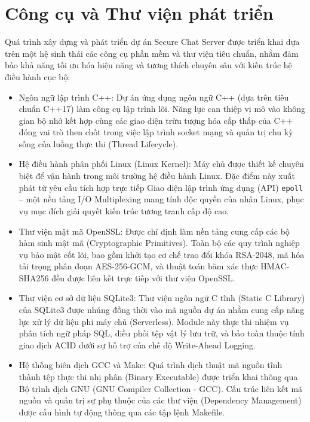 \section{Công cụ và Thư viện phát triển}

Quá trình xây dựng và phát triển dự án Secure Chat Server được triển khai dựa trên một hệ sinh thái các công cụ phần mềm và thư viện tiêu chuẩn, nhằm đảm bảo khả năng tối ưu hóa hiệu năng và tương thích chuyên sâu với kiến trúc hệ điều hành cục bộ:
\begin{itemize}[label={-}]
    \item Ngôn ngữ lập trình C++: Dự án ứng dụng ngôn ngữ C++ (dựa trên tiêu chuẩn C++17) làm công cụ lập trình lõi. Năng lực can thiệp vi mô vào không gian bộ nhớ kết hợp cùng các giao diện trừu tượng hóa cấp thấp của C++ đóng vai trò then chốt trong việc lập trình socket mạng và quản trị chu kỳ sống của luồng thực thi (Thread Lifecycle).
    \item Hệ điều hành phân phối Linux (Linux Kernel): Máy chủ được thiết kế chuyên biệt để vận hành trong môi trường hệ điều hành Linux. Đặc điểm này xuất phát từ yêu cầu tích hợp trực tiếp Giao diện lập trình ứng dụng (API) \texttt{epoll} – một nền tảng I/O Multiplexing mang tính độc quyền của nhân Linux, phục vụ mục đích giải quyết kiến trúc tương tranh cấp độ cao.
    \item Thư viện mật mã OpenSSL: Được chỉ định làm nền tảng cung cấp các bộ hàm sinh mật mã (Cryptographic Primitives). Toàn bộ các quy trình nghiệp vụ bảo mật cốt lõi, bao gồm khởi tạo cơ chế trao đổi khóa RSA-2048, mã hóa tải trọng phân đoạn AES-256-GCM, và thuật toán băm xác thực HMAC-SHA256 đều được liên kết trực tiếp với thư viện OpenSSL.
    \item Thư viện cơ sở dữ liệu SQLite3: Thư viện ngôn ngữ C tĩnh (Static C Library) của SQLite3 được nhúng đồng thời vào mã nguồn dự án nhằm cung cấp năng lực xử lý dữ liệu phi máy chủ (Serverless). Module này thực thi nhiệm vụ phân tích ngữ pháp SQL, điều phối tệp vật lý lưu trữ, và bảo toàn thuộc tính giao dịch ACID dưới sự hỗ trợ của chế độ Write-Ahead Logging.
    \item Hệ thống biên dịch GCC và Make: Quá trình dịch thuật mã nguồn tĩnh thành tệp thực thi nhị phân (Binary Executable) được triển khai thông qua Bộ trình dịch GNU (GNU Compiler Collection - GCC). Cấu trúc liên kết mã nguồn và quản trị sự phụ thuộc của các thư viện (Dependency Management) được cấu hình tự động thông qua các tập lệnh Makefile.
\end{itemize}
